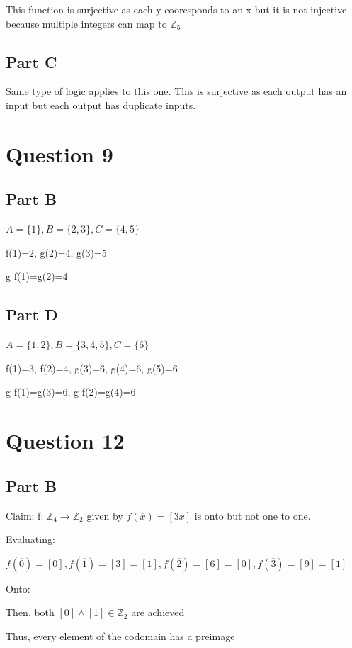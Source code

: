 \documentclass{article}
\begin{document}
This function is surjective as each y cooresponds to an x but it is not injective because multiple integers can map to $\mathbb{Z}_5$

\subsection*{Part C}

Same type of logic applies to this one. This is surjective as each output has an input but each output has duplicate inputs.

\section*{Question 9}
\subsection*{Part B}

$A=\{1\}, B=\{2,3\}, C=\{4,5\}$

f(1)=2, g(2)=4, g(3)=5

g \textopenbullet f(1)=g(2)=4

\subsection*{Part D}

$A=\{1,2\}, B=\{3,4,5\}, C=\{6\}$

f(1)=3, f(2)=4, g(3)=6, g(4)=6, g(5)=6

g \textopenbullet f(1)=g(3)=6, g \textopenbullet f(2)=g(4)=6

\section*{Question 12}
\subsection*{Part B}

Claim: f: $\mathbb{Z}_4 \rightarrow \mathbb{Z}_2$ given by $f(\overline{x})=[3x]$ is onto but not one to one.

Evaluating:

$f(\overline{0})=[0], f(\overline{1})=[3]=[1], f(\overline{2})=[6]=[0], f(\overline{3})=[9]=[1]$

Onto:

Then, both $[0] \wedge [1] \in \mathbb{Z}_2$ are achieved

Thus, every element of the codomain has a preimage
\end{document}
